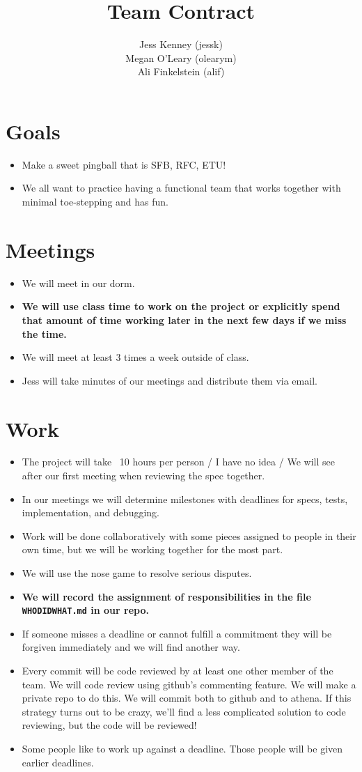 \documentclass{article}
\title{Team Contract}
\author{Jess Kenney (jessk)\\Megan O'Leary (olearym)\\Ali Finkelstein (alif)}
\begin{document}
\maketitle
\section{Goals}
\begin{itemize}
\item Make a sweet pingball that is SFB, RFC, ETU!
\item We all want to practice having a functional team that works together with minimal toe-stepping and has fun.
\end{itemize}

\section{Meetings}
\begin{itemize}
\item We will meet in our dorm.
\item \textbf{We will use class time to work on the project or explicitly spend that amount of time working later in the next few days if we miss the time.}
\item We will meet at least 3 times a week outside of class.
\item Jess will take minutes of our meetings and distribute them via email.
\end{itemize}

\section{Work}
\begin{itemize}
\item The project will take ~10 hours per person / I have no idea / We will see after our first meeting when reviewing the spec together.
\item In our meetings we will determine milestones with deadlines for specs, tests, implementation, and debugging.
\item Work will be done collaboratively with some pieces assigned to people in their own time, but we will be working together for the most part. 
\item We will use the nose game to resolve serious disputes.
\item \textbf{We will record the assignment of responsibilities in the file \texttt{WHODIDWHAT.md} in our repo.}
\item If someone misses a deadline or cannot fulfill a commitment they will be forgiven immediately and we will find another way.
\item Every commit will be code reviewed by at least one other member of the team. We will code review using github's commenting feature. We will make a private repo to do this. We will commit both to github and to athena. If this strategy turns out to be crazy, we'll find a less complicated solution to code reviewing, but the code will be reviewed!
\item Some people like to work up against a deadline. Those people will be given earlier deadlines.
\end{itemize}
\end{document}
